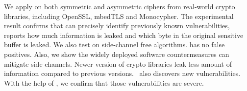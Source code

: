 


We apply \tool{} on both symmetric and asymmetric ciphers from real-world crypto
libraries, including OpenSSL, mbedTLS and Monocypher\@. The experimental result confirms
that \tool{} can precisely identify previously known vulnerabilities, reports
how much information is leaked and which byte in the original sensitive buffer
is leaked. We also test \tool{} on side-channel free algorithms. \tool{} has no
false positives.
Also, we show the
widely deployed software countermeasures can mitigate side channels.
Newer version of crypto libraries leak less amount of information 
compared to previous versions.
\tool\ also discovers new vulnerabilities. With the help of \tool{}, we confirm
that those vulnerabilities are severe.

